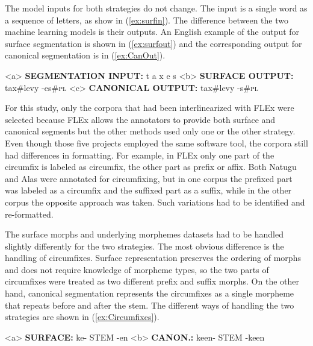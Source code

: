 The model inputs for both strategies do not change. The input is a single word as a sequence of letters, as show in (\ref{ex:surfin}). 
The difference between the two machine learning models is their outputs.  An English example of the output for surface segmentation is shown in (\ref{ex:surfout}) and the corresponding output for canonical segmentation is in (\ref{ex:CanOut}).

\pex   
\label{ex:CanInOut}
\a<a> \textbf{SEGMENTATION INPUT:} \hspace{2 mm} t \hspace{2 mm} a \hspace{2 mm} x \hspace{2 mm} e \hspace{2 mm} s
\label{ex:surfin}
\a<b> \textbf{SURFACE OUTPUT:} \hspace{14 mm} tax\#levy \hspace{3 mm} -es\#\textsc{pl}
\label{ex:surfout}
\a<c> \textbf{CANONICAL OUTPUT:} \hspace{7 mm} tax\#levy \hspace{3 mm} -s\#\textsc{pl} 
\label{ex:CanOut}
\xe

For this study, only the corpora that had been interlinearized with FLEx were selected because FLEx allows the annotators to provide both surface and canonical segments but the other methods used only one or the other strategy. 
Even though those five projects employed the same software tool, the corpora still had differences in formatting. For example, in FLEx only one part of the circumfix is labeled as circumfix, the other part as prefix or affix. Both Natugu and Alas were annotated for circumfixing, but in one corpus the prefixed part was labeled as a circumfix and the suffixed part as a suffix, while in the other corpus the opposite approach was taken. Such variations had to be identified and re-formatted.

The surface morphs and underlying morphemes datasets had to be handled slightly differently for the two strategies. The most obvious difference is the handling of circumfixes. Surface representation preserves the ordering of morphs and does not require knowledge of morpheme types, so the two parts of circumfixes were treated as two different prefix and suffix morphs.  On the other hand, canonical segmentation represents the circumfixes as a single morpheme that repeats before and after the stem. The different ways of handling the two strategies are shown in (\ref{ex:Circumfixes}).

\pex   
\label{ex:Circumfixes}
\a<a> \textbf{SURFACE:} \hspace{2 mm} ke- \hspace{4 mm}  STEM  \hspace{1 mm} -en
\label{ex:circumsurf}
\a<b> \textbf{CANON.:} \hspace{1 mm} ke\textlangle{}\textrangle{}en- \hspace{1 mm} STEM \hspace{1 mm} -ke\textlangle{}\textrangle{}en
\label{ex:circumcan}
\xe

